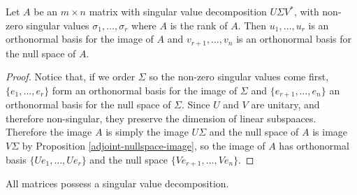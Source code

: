 \begin{prop}
    Let $A$ be an $m \times n$ matrix with singular value decomposition $U\Sigma V^{*}$, with non-zero singular values $\sigma_1, \ldots, \sigma_r$ where $A$ is the rank of $A$. Then $u_1, \ldots, u_r$ is an orthonormal basis for the image of $A$ and $v_{r+1}, \ldots, v_n$ is an orthonormal basis for the null space of $A$.
\end{prop}

\begin{proof}
    Notice that, if we order $\Sigma$ so the non-zero singular values come first, $\{e_1, \ldots, e_r\}$ form an orthonormal basis for the image of $\Sigma$ and $\{e_{r+1}, \ldots, e_n\}$ an orthonormal basis for the null space of $\Sigma$. Since $U$ and $V$ are unitary, and therefore non-singular, they preserve the dimension of linear subspaaces. Therefore the image $A$ is simply the image $U\Sigma$ and the null space of $A$ is image $V\Sigma$ by Proposition \ref{adjoint-nullspace-image}, so the image of $A$ has orthonormal basis $\{Ue_1, \ldots, Ue_{r}\}$ and the null space $\{Ve_{r+1}, \ldots, Ve_{n}\}$.
\end{proof}

\begin{thm}
    All matrices possess a singular value decomposition.
\end{thm}

